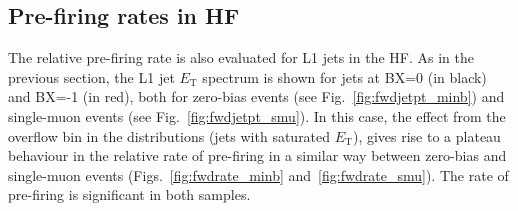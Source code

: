 \documentclass[11pt]{cmspaperpdf}
\newcommand{\et}{\ensuremath{E_{\textrm{T}}}\xspace}
\begin{document}
\subsection{Pre-firing rates in HF}
\label{sec:rates_hf}

The relative pre-firing rate is also evaluated for L1 jets in the HF. As in the previous section, the L1 jet \et spectrum is shown for jets at BX=0 (in black) and BX=-1 (in red), both for zero-bias events (see Fig.~\ref{fig:fwdjetpt_minb}) and single-muon events (see Fig.~\ref{fig:fwdjetpt_smu}). In this case, the effect from the overflow bin in the distributions (jets with saturated \et), gives rise to a plateau behaviour in the relative rate of pre-firing in a similar way between zero-bias and single-muon events (Figs.~\ref{fig:fwdrate_minb} and~\ref{fig:fwdrate_smu}). The rate of pre-firing is significant in both samples.
\end{document}

